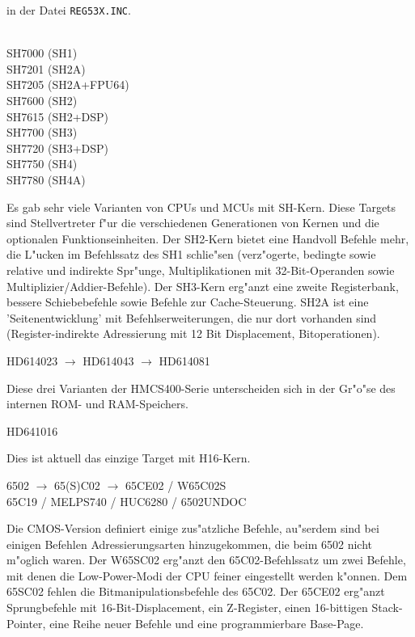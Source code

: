 \documentclass[12pt,a4paper,twoside]{report}
\newcommand{\tty}[1]{{\tt #1}}
\begin{document}
in der Datei \tty{REG53X.INC}.
\begin{cpulist} \\
   SH7000 (SH1) \\
   SH7201 (SH2A) \\
   SH7205 (SH2A+FPU64) \\
   SH7600 (SH2) \\
   SH7615 (SH2+DSP) \\
   SH7700 (SH3) \\
   SH7720 (SH3+DSP) \\
   SH7750 (SH4) \\
   SH7780 (SH4A) \\
\end{cpulist}
Es gab sehr viele Varianten von CPUs und MCUs mit SH-Kern.  Diese Targets
sind Stellvertreter f"ur die verschiedenen Generationen von Kernen
und die optionalen Funktionseinheiten.  Der SH2-Kern bietet eine
Handvoll Befehle mehr, die L"ucken im Befehlssatz des SH1 schlie"sen
(verz"ogerte, bedingte sowie relative und indirekte Spr"unge,
Multiplikationen mit 32-Bit-Operanden sowie Multiplizier/Addier-Befehle).
Der SH3-Kern erg"anzt eine zweite Registerbank, bessere Schiebebefehle
sowie Befehle zur Cache-Steuerung.  SH2A ist eine 'Seitenentwicklung'
mit Befehlserweiterungen, die nur dort vorhanden sind (Register-indirekte
Adressierung mit 12 Bit Displacement, Bitoperationen).
\begin{cpulist}
   HD614023 $\longrightarrow$ HD614043 $\longrightarrow$ HD614081
\end{cpulist}
Diese drei Varianten der HMCS400-Serie unterscheiden sich in der
Gr"o"se des internen ROM- und RAM-Speichers.
\begin{cpulist}
   HD641016
\end{cpulist}
Dies ist aktuell das einzige Target mit H16-Kern.
\begin{cpulist}
   6502 $\rightarrow$ 65(S)C02 $\rightarrow$ 65CE02 / W65C02S\\
\> 65C19 / MELPS740 / HUC6280 / 6502UNDOC
\end{cpulist}
Die CMOS-Version definiert einige zus"atzliche Befehle, au"serdem sind
bei einigen Befehlen Adressierungsarten hinzugekommen, die beim 6502
nicht m"oglich waren.  Der W65SC02 erg"anzt den
65C02-Befehlssatz um zwei Befehle, mit denen die Low-Power-Modi
der CPU feiner eingestellt werden k"onnen.  Dem 65SC02 fehlen die
Bitmanipulationsbefehle des 65C02.  Der 65CE02 erg"anzt Sprungbefehle
mit 16-Bit-Displacement, ein Z-Register, einen 16-bittigen Stack-Pointer,
eine Reihe neuer Befehle und eine programmierbare Base-Page.
\end{document}
